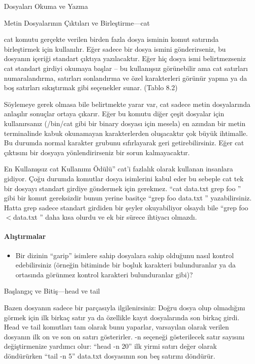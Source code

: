 \begin{section}{Dosyaları Okuma ve Yazma}
\begin{subsection}{Metin Dosyalarının Çıktıları ve Birleştirme—cat}

cat komutu gerçekte verilen birden fazla dosya isminin komut satırında birleştirmek için kullanılır. Eğer sadece bir dosya ismini gönderirseniz, bu dosyanın içeriği standart çıktıya yazılacaktır. Eğer hiç dosya ismi belirtmezseniz cat standart girdiyi okumaya başlar – bu kullanışsız görünebilir ama cat satırları numaralandırma, satırları sonlandırma ve özel karakterleri görünür yapma ya da boş satırları sıkıştırmak gibi seçenekler sunar. (Tablo 8.2)

Söylemeye gerek olmasa bile belirtmekte yarar var, cat sadece metin dosyalarında anlaşılır sonuçlar ortaya çıkarır. Eğer bu komutu diğer çeşit dosyalar için kullanırsanız (/bin/cat gibi bir binary dosyası için mesela) en azından bir metin terminalinde kabuk okunamayan karakterlerden oluşacaktır çok büyük ihtimalle. Bu durumda normal karakter grubunu sıfırlayarak geri getirebilirsiniz. Eğer cat çıktısını bir dosyaya yönlendirirseniz bir sorun kalmayacaktır.

En Kullanışsız cat Kullanımı Ödülü” cat'i fazlalık olarak kullanan insanlara gidiyor. Çoğu durumda komutlar dosya isimlerini kabul eder bu sebeple cat tek bir dosyayı standart girdiye göndermek için gerekmez. “cat data.txt \textbar grep foo ” gibi bir komut gereksizdir bunun yerine basitçe “grep foo data.txt ” yazabilirsiniz. Hatta grep sadece standart girdiden bir şeyler okuyabiliyor olsaydı bile “grep foo $<$data.txt ” daha kısa olurdu ve ek bir sürece ihtiyacı olmazdı.

\paragraph{Alıştırmalar}{
\begin{itemize}
 \item Bir dizinin “garip” isimlere sahip dosyalara sahip olduğunu nasıl kontrol edebilirsiniz (örneğin bitiminde bir boşluk karakteri bulunduranlar ya da ortasında görünmez kontrol karakteri bulunduranlar gibi)?
\end{itemize}}
\end{subsection}
\begin{subsection}{Başlangıç ve Bitiş—head ve tail}

Bazen dosyanın sadece bir parçasıyla ilgilenirsiniz: Doğru dosya olup olmadığını görmek için ilk birkaç satır ya da özellikle kayıt dosyalarında son birkaç girdi. Head ve tail komutları tam olarak bunu yaparlar, varsayılan olarak verilen dosyanın ilk on ve son on satırı gösterirler. -n seçeneği gösterilecek satır sayısını değiştirmenize yardımcı olur: “head -n 20” ilk yirmi satırı değer olarak döndürürken “tail -n 5” data.txt dosyasının son beş satırını döndürür.


\end{subsection}
\end{section}
